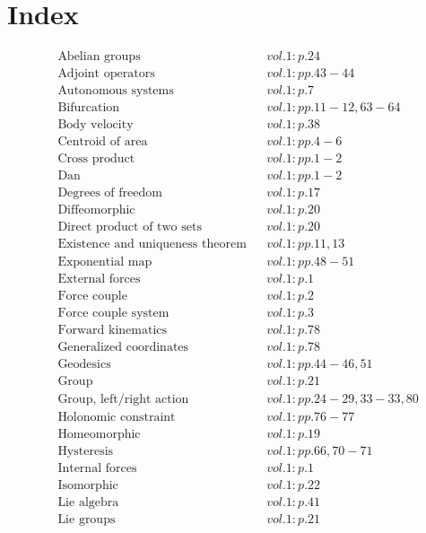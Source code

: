 \documentclass[a4paper]{article}
\begin{document}
 
\section*{Index} 
\allowdisplaybreaks 
\begin{align*} 
&\text{Abelian groups}&& vol. 1: p. 24\\
&\text{Adjoint operators}&& vol. 1: pp. 43-44\\
&\text{Autonomous systems}&& vol. 1: p. 7\\
&\text{Bifurcation}&& vol. 1: pp. 11-12, 63-64\\
&\text{Body velocity}&& vol. 1: p. 38\\
&\text{Centroid of area}&& vol. 1: pp. 4-6\\
&\text{Cross product}&& vol. 1: pp. 1-2\\
&\text{Dan}&& vol. 1: pp. 1-2\\
&\text{Degrees of freedom}&& vol. 1: p. 17\\
&\text{Diffeomorphic}&& vol. 1: p. 20\\
&\text{Direct product of two sets}&& vol. 1: p. 20\\
&\text{Existence and uniqueness theorem}&& vol. 1: pp. 11, 13\\
&\text{Exponential map}&& vol. 1: pp. 48-51\\
&\text{External forces}&& vol. 1: p. 1\\
&\text{Force couple}&& vol. 1: p. 2\\
&\text{Force couple system}&& vol. 1: p. 3\\
&\text{Forward kinematics}&& vol. 1: p. 78\\
&\text{Generalized coordinates}&& vol. 1: p. 78\\
&\text{Geodesics}&& vol. 1: pp. 44-46, 51\\
&\text{Group}&& vol. 1: p. 21\\
&\text{Group, left/right action}&& vol. 1: pp. 24-29, 33-33, 80\\
&\text{Holonomic constraint}&& vol. 1: pp. 76-77\\
&\text{Homeomorphic}&& vol. 1: p. 19\\
&\text{Hysteresis}&& vol. 1: pp. 66, 70-71\\
&\text{Internal forces}&& vol. 1: p. 1\\
&\text{Isomorphic}&& vol. 1: p. 22\\
&\text{Lie algebra}&& vol. 1: p. 41\\
&\text{Lie groups}&& vol. 1: p. 21\\

\end{align*}
\end{document}
